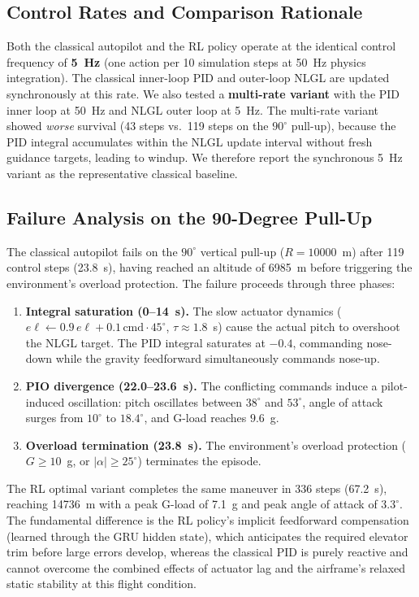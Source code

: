\documentclass{article}
\begin{document}
\subsection{Control Rates and Comparison Rationale}

Both the classical autopilot and the RL policy operate at the identical
control frequency of \textbf{5~Hz} (one action per 10 simulation steps at
50~Hz physics integration).  The classical inner-loop PID and outer-loop
NLGL are updated synchronously at this rate.  We also tested a
\textbf{multi-rate variant} with the PID inner loop at 50~Hz and NLGL
outer loop at 5~Hz.  The multi-rate variant showed \emph{worse}
survival (43 steps vs.\ 119 steps on the $90^\circ$ pull-up), because
the PID integral accumulates within the NLGL update interval without
fresh guidance targets, leading to windup.  We therefore report the
synchronous 5~Hz variant as the representative classical baseline.

\subsection{Failure Analysis on the 90-Degree Pull-Up}

The classical autopilot fails on the $90^\circ$ vertical pull-up
($R = 10000$~m) after 119 control steps (23.8~s), having reached an
altitude of 6985~m before triggering the environment's overload
protection.  The failure proceeds through three phases:

\begin{enumerate}
  \item \textbf{Integral saturation (0--14~s).}
        The slow actuator dynamics ($e\ell \leftarrow 0.9\,e\ell +
        0.1\,\mathrm{cmd}\cdot 45^\circ$, $\tau \approx 1.8$~s) cause
        the actual pitch to overshoot the NLGL target.  The PID integral
        saturates at $-0.4$, commanding nose-down while the gravity
        feedforward simultaneously commands nose-up.
  \item \textbf{PIO divergence (22.0--23.6~s).}
        The conflicting commands induce a pilot-induced oscillation:
        pitch oscillates between $38^\circ$ and $53^\circ$, angle of
        attack surges from $10^\circ$ to $18.4^\circ$, and G-load
        reaches $9.6$~g.
  \item \textbf{Overload termination (23.8~s).}
        The environment's overload protection ($G \geq 10$~g, or
        $|\alpha| \geq 25^\circ$) terminates the episode.
\end{enumerate}

The RL optimal variant completes the same maneuver in 336 steps (67.2~s),
reaching 14736~m with a peak G-load of 7.1~g and peak angle of attack
of $3.3^\circ$.  The fundamental difference is the RL policy's implicit
feedforward compensation (learned through the GRU hidden state), which
anticipates the required elevator trim before large errors develop,
whereas the classical PID is purely reactive and cannot overcome the
combined effects of actuator lag and the airframe's relaxed static
stability at this flight condition.
\end{document}

